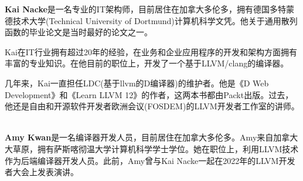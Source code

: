 \textbf{Kai Nacke}是一名专业的IT架构师，目前居住在加拿大多伦多，拥有德国多特蒙德技术大学(Technical University of Dortmund)计算机科学文凭。他关于通用散列函数的毕业论文是当时最好的论文之一。

Kai在IT行业拥有超过20年的经验，在业务和企业应用程序的开发和架构方面拥有丰富的专业知识。在他目前的职位上，开发了一个基于LLVM/clang的编译器。

几年来，Kai一直担任LDC(基于llvm的D编译器)的维护者。他是《D Web Development》和《Learn LLVM 12》的作者，这两本书都由Packt出版。过去，他还是自由和开源软件开发者欧洲会议(FOSDEM)的LLVM开发者工作室的讲师。

\hspace*{\fill} \\

\textbf{Amy Kwan}是一名编译器开发人员，目前居住在加拿大多伦多。Amy来自加拿大大草原，拥有萨斯喀彻温大学计算机科学学士学位。她在职位上，利用LLVM技术作为后端编译器开发人员。此前，Amy曾与Kai Nacke一起在2022年的LLVM开发者大会上发表演讲。




















